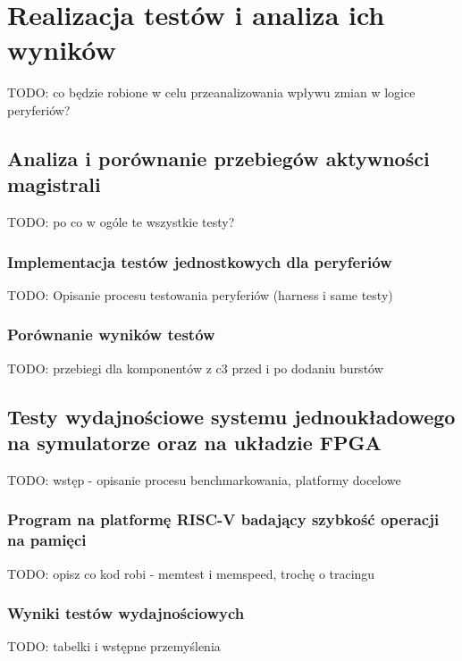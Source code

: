 \section{Realizacja testów i analiza ich wyników}
TODO: co będzie robione w celu przeanalizowania wpływu zmian w logice peryferiów?

\subsection{Analiza i porównanie przebiegów aktywności magistrali}
TODO: po co w ogóle te wszystkie testy?

\subsubsection{Implementacja testów jednostkowych dla peryferiów}
TODO: Opisanie procesu testowania peryferiów (harness i same testy)

\subsubsection{Porównanie wyników testów}
TODO: przebiegi dla komponentów z c3 przed i po dodaniu burstów

\subsection{Testy wydajnościowe systemu jednoukładowego na symulatorze oraz na układzie FPGA}
TODO: wstęp - opisanie procesu benchmarkowania, platformy docelowe

\subsubsection{Program na platformę RISC-V badający szybkość operacji na pamięci}
TODO: opisz co kod robi - memtest i memspeed, trochę o tracingu

\subsubsection{Wyniki testów wydajnościowych}
TODO: tabelki i wstępne przemyślenia